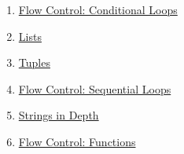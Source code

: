 \documentclass[a4paper,11pt]{article}
\begin{document}
{\begin{enumerate}
	\item \href{while_loops.html}{Flow Control: Conditional Loops}
	\item \href{lists.html}{Lists}
	\item \href{tuples.html}{Tuples}
	\item \href{for_loops.html}{Flow Control: Sequential Loops}
	\item \href{strings.html}{Strings in Depth}
	\item \href{functions.html}{Flow Control: Functions}
%  
% 
% 
% 
% 
% 
% 
% 
% 
% 
% 
% 
% 
% 
% 
% 			
% 
% 
% 
% 
% 			
% 			
% 			
% 
% 
% 
% 
% 
% 
% 



\end{enumerate}}
\end{document}
